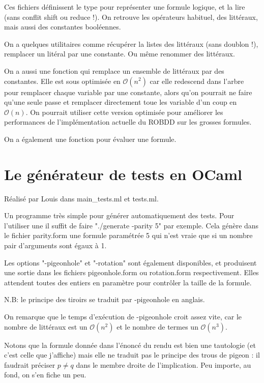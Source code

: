 \documentclass[a4paper,10pt]{article}
\begin{document}
Ces fichiers définissent le type pour représenter une formule logique, et la lire (sans conflit shift ou reduce !).
On retrouve les opérateurs habituel, des littéraux, mais aussi des constantes booléennes.

On a quelques utilitaires comme récupérer la listes des littéraux (sans doublon !), remplacer un litéral par une constante. Ou même renommer des littéraux. 

On a aussi une fonction qui remplace un ensemble de littéraux par des constantes. Elle est sous optimisée en $\mathcal{O}(n^2)$ car elle redescend dans l'arbre pour remplacer chaque variable par une constante, 
alors qu'on pourrait ne faire qu'une seule passe et remplacer directement toue les variable d'un coup en $\mathcal{O}(n)$. 
On pourrait utiliser cette version optimisée pour améliorer les performances de l'implémentation actuelle du ROBDD sur les grosses formules.

On a également une fonction pour évaluer une formule.

\section{Le générateur de tests en OCaml}
Réalisé par Louis dans main\_tests.ml et tests.ml.

Un programme très simple pour générer automatiquement des tests.
Pour l'utiliser une il suffit de faire "./generate -parity 5" par exemple. Cela génère dans le fichier parity.form une formule paramétrée 5 qui n'est vraie que si un nombre pair d'arguments sont égaux à 1.

Les options "-pigeonhole" et "-rotation" sont également disponibles, et produisent une sortie dans les fichiers pigeonhole.form ou rotation.form respectivement. Elles attendent toutes des entiers en paramètre pour contrôler la taille de la formule.

N.B: le principe des tiroirs se traduit par -pigeonhole en anglais.  

On remarque que le temps d'exécution de -pigeonhole croit assez vite, car le nombre de littéraux est un $\mathcal{O}(n^2)$ et le nombre de termes un $\mathcal{O}(n^3)$.  
  
Notons que la formule donnée dans l'énoncé du rendu est bien une tautologie (et c'est celle que j'affiche) mais elle ne traduit pas le principe des trous de pigeon : il faudrait préciser $p \neq q$ dans le membre droite de l'implication. Peu importe, au fond, on s'en fiche un peu.
\end{document}
